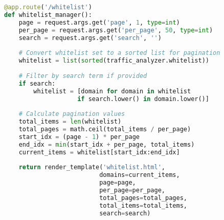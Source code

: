 \begin{lstlisting}[language=Python, caption=Whitelist Management Routes]
@app.route('/whitelist')
def whitelist_manager():
    page = request.args.get('page', 1, type=int)
    per_page = request.args.get('per_page', 50, type=int)
    search = request.args.get('search', '')
    
    # Convert whitelist set to a sorted list for pagination
    whitelist = list(sorted(traffic_analyzer.whitelist))
    
    # Filter by search term if provided
    if search:
        whitelist = [domain for domain in whitelist 
                    if search.lower() in domain.lower()]
    
    # Calculate pagination values
    total_items = len(whitelist)
    total_pages = math.ceil(total_items / per_page)
    start_idx = (page - 1) * per_page
    end_idx = min(start_idx + per_page, total_items)
    current_items = whitelist[start_idx:end_idx]
    
    return render_template('whitelist.html', 
                          domains=current_items, 
                          page=page, 
                          per_page=per_page, 
                          total_pages=total_pages,
                          total_items=total_items,
                          search=search)
\end{lstlisting}
